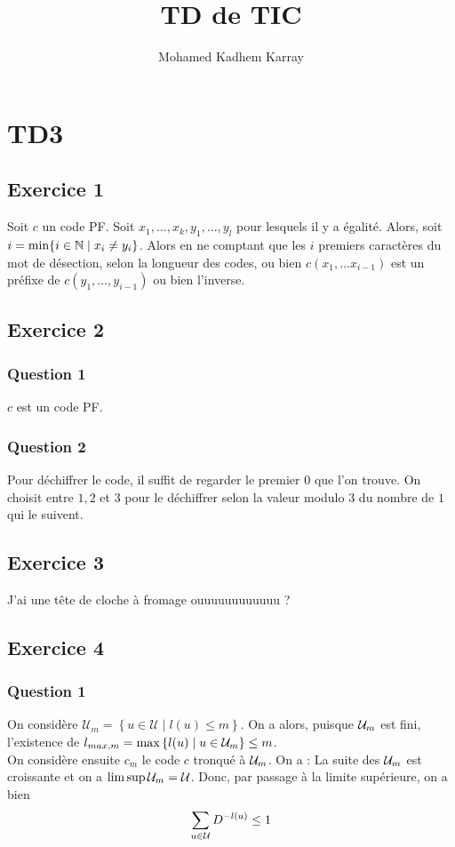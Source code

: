 \documentclass{cours}
\title{TD de TIC}
\author{Mohamed Kadhem Karray}
\begin{document}
\section{TD3}
\subsection{Exercice 1}
Soit $c$ un code PF. Soit $x_1, \ldots, x_{k}, y_{1}, \ldots, y_{l}$ pour lesquels il y a égalité. Alors, soit $i = \min \{i \in \mathbb{N} \mid x_{i} \neq y_{i}\}$. Alors en ne comptant que les $i$ premiers caractères du mot de désection, selon la longueur des codes, ou bien $c(x_{1},\ldots x_{i - 1})$ est un préfixe de $c(y_{1}, \ldots, y_{i - 1})$ ou bien l'inverse.

\subsection{Exercice 2}
\subsubsection{Question 1}
$c$ est un code PF. 

\subsubsection{Question 2}
Pour déchiffrer le code, il suffit de regarder le premier $0$ que l'on trouve. On choisit entre $1, 2$ et $3$ pour le déchiffrer selon la valeur modulo $3$ du nombre de $1$ qui le suivent. 

\subsection{Exercice 3}
J'ai une tête de cloche à fromage ouuuuuuuuuuuu ?

\subsection{Exercice 4}
\subsubsection{Question 1}
On considère $\mathcal{U}_{m} = \left\{u \in \mathcal{U} \mid l(u) \leq m\right\}$. On a alors, puisque $\mathcal{U}_{m}$ est fini, l'existence de $l_{max, m} = \max \left\{l(u) \mid u \in \mathcal{U}_{m}\right\} \leq m$. \\
On considère ensuite $c_{m}$ le code $c$ tronqué à $\mathcal{U}_{m}$. On a :  
La suite des $\mathcal{U}_{m}$ est croissante et on a $\limsup \mathcal{U}_{m} = \mathcal{U}$. Donc, par passage à la limite supérieure, on a bien 
\[
    \sum_{u \in \mathcal{U}}D^{-l(u)} \leq 1
\]
\end{document}
